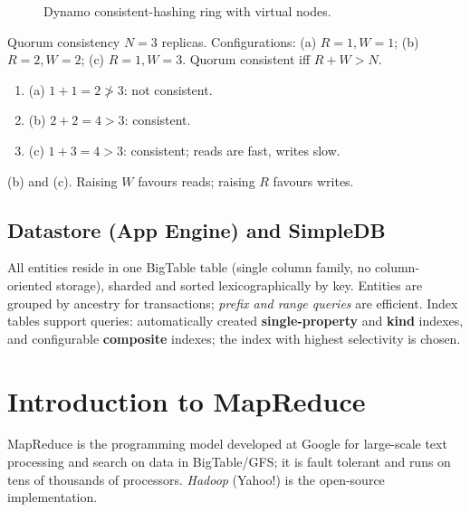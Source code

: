 \begin{figure}[H]
\centering
{}
\caption{Dynamo consistent-hashing ring with virtual nodes.}
\end{figure}

\begin{solved}{Quorum consistency}
\Given $N = 3$ replicas. Configurations: (a) $R=1, W=1$; (b) $R=2, W=2$; (c) $R=1, W=3$.
\Formula Quorum consistent iff $R + W > N$.
\Steps
\begin{enumerate}[leftmargin=*]
  \item (a) $1 + 1 = 2 \not> 3$: not consistent.
  \item (b) $2 + 2 = 4 > 3$: consistent.
  \item (c) $1 + 3 = 4 > 3$: consistent; reads are fast, writes slow.
\end{enumerate}
\Answer (b) and (c). Raising $W$ favours reads; raising $R$ favours writes.
\end{solved}

\subsection{Datastore (App Engine) and SimpleDB}
All entities reside in one BigTable table (single column family, no column-oriented storage), sharded and sorted lexicographically by
key. Entities are grouped by ancestry for transactions; \emph{prefix and range queries} are efficient. Index tables support queries:
automatically created \textbf{single-property} and \textbf{kind} indexes, and configurable \textbf{composite} indexes; the index
with highest selectivity is chosen.

\section{Introduction to MapReduce}
MapReduce is the programming model developed at Google for large-scale text processing and search on data in BigTable/GFS; it is
fault tolerant and runs on tens of thousands of processors. \emph{Hadoop} (Yahoo!) is the open-source implementation.

